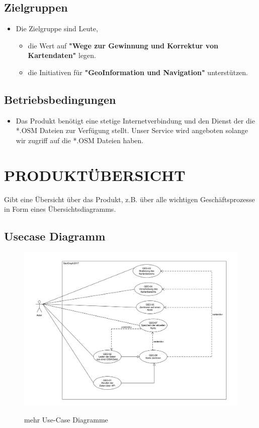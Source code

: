 	\subsection{Zielgruppen}
	\begin{itemize}
		\item Die Zielgruppe sind Leute, 
		\begin{itemize}
			\item die Wert auf \textbf{"Wege zur Gewinnung und Korrektur von Kartendaten"} legen.
			\item die Initiativen für \textbf{"GeoInformation und Navigation"} unterstützen.
		\end{itemize}
	\end{itemize}
	\subsection{Betriebsbedingungen}
	\begin{itemize}
		\item Das Produkt benötigt eine stetige Internetverbindung und den Dienst der die *.OSM Dateien zur Verfügung stellt. Unser Service wird angeboten solange wir zugriff auf die *.OSM Dateien haben.
	\end{itemize}
	
	
	\section{\Large PRODUKTÜBERSICHT}
	Gibt eine Übersicht über das Produkt, z.B. über alle wichtigen Geschäftsprozesse in Form eines Übersichtsdiagramms.
	\subsection{Usecase Diagramm}
	\begin{figure}[H]
	\centering
	\includegraphics[width=0.7\linewidth]{images/Usecases}
	\caption{}
	\label{fig:GUI}
	mehr Use-Case Diagramme
	\end{figure}
